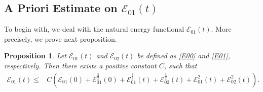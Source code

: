 \documentclass[reqno,11pt]{amsart}
\newtheorem{Prop}[Thm]{Proposition}
\numberwithin{Thm}{section}
\begin{document}
\subsection{A Priori Estimate on $\mathcal{E}_{01}(t)$ }
\label{Set1}
 To begin with, we deal with the natural energy functional $\mathcal{E}_{01}(t)$. More precisely, we prove next proposition.
\begin{Prop}\label{Pro11}
Let $\mathcal{E}_{01}(t)$ and $\mathcal{E}_{02}(t)$ be defined as \eqref{E00} and \eqref{E01}, respectively. Then there exists a positive constant $C$, such that
\begin{align}\label{in3.1}
\mathcal{E}_{01}(t)\leq& C\left(\mathcal{E}_{01}(0)+\mathcal{E}_{01}^{\frac{3}{2}}(0)+\mathcal{E}_{01}^{\frac{3}{2}}(t)+\mathcal{E}_{02}^{\frac{3}{2}}(t)+\mathcal{E}_{01}^{2}(t)+\mathcal{E}_{02}^{2}(t)\right).
\end{align}
\end{Prop}
\end{document}

